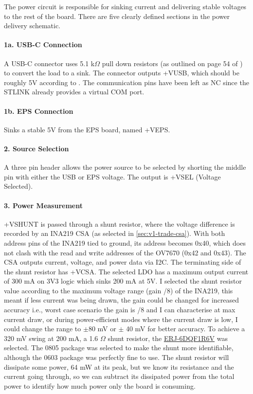 The power circuit is responsible for sinking current and delivering stable voltages to the rest of the board. There are five clearly defined sections in the power delivery schematic.

\paragraph{1a. USB-C Connection}
A USB-C connector uses 5.1 k$\Omega$ pull down resistors (as outlined on page 54 of \cite{ti-usb-typec-guide}) to convert the load to a sink. The connector outputs +VUSB, which should be roughly 5V according to \cite{ti-usb-typec-guide}. The communication pins have been left as NC since the STLINK already provides a virtual COM port.

\paragraph{1b. EPS Connection}
Sinks a stable 5V from the EPS board, named +VEPS.

\paragraph{2. Source Selection}
A three pin header allows the power source to be selected by shorting the middle pin with either the USB or EPS voltage. The output is +VSEL (Voltage Selected).

\paragraph{3. Power Measurement}
+VSHUNT is passed through a shunt resistor, where the voltage difference is recorded by an INA219 CSA (as selected in \autoref{sec:v1-trade-csa}). 
With both address pins of the INA219 tied to ground, its address becomes 0x40, which does not clash with the read and write addresses of the OV7670 (0x42 and 0x43).
The CSA outputs current, voltage, and power data via I2C. The terminating side of the shunt resistor has +VCSA.
The selected LDO has a maximum output current of 300 mA on 3V3 logic which sinks 200 mA at 5V.
I selected the shunt resistor value according to the maximum voltage range (gain /8) of the INA219, this meant if less current was being drawn, the gain could be changed for increased accuracy i.e., worst case scenario the gain is /8 and I can characterise at max current draw, or during power-efficient modes where the current draw is low, I could change the range to $\pm$80 mV or $\pm$ 40 mV for better accuracy.
To achieve a 320 mV swing at 200 mA, a 1.6 $\Omega$ shunt resistor, the \href{https://au.mouser.com/ProductDetail/Panasonic/ERJ-6DQF1R6V?qs=WO7YBshssFHHp%2FMEk%2F2ARA%3D%3D}{ERJ-6DQF1R6V} was selected.
The 0805 package was selected to make the shunt more identifiable, although the 0603 package was perfectly fine to use.
The shunt resistor will dissipate some power, 64 mW at its peak, but we know its resistance and the current going through, so we can subtract its dissipated power from the total power to identify how much power only the board is consuming.

